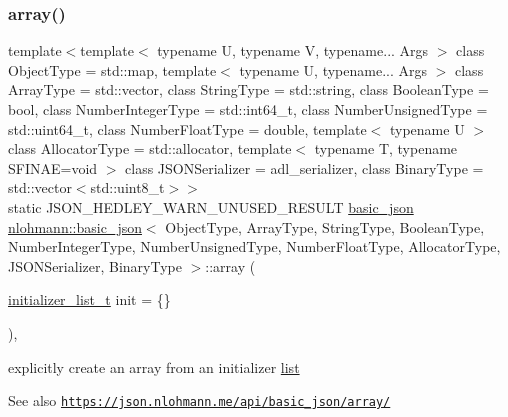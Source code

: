 \subsubsection{\texorpdfstring{array()}{array()}}
{\footnotesize\ttfamily template$<$template$<$ typename U, typename V, typename... Args $>$ class Object\+Type = std\+::map, template$<$ typename U, typename... Args $>$ class Array\+Type = std\+::vector, class String\+Type  = std\+::string, class Boolean\+Type  = bool, class Number\+Integer\+Type  = std\+::int64\+\_\+t, class Number\+Unsigned\+Type  = std\+::uint64\+\_\+t, class Number\+Float\+Type  = double, template$<$ typename U $>$ class Allocator\+Type = std\+::allocator, template$<$ typename T, typename S\+F\+I\+N\+A\+E=void $>$ class J\+S\+O\+N\+Serializer = adl\+\_\+serializer, class Binary\+Type  = std\+::vector$<$std\+::uint8\+\_\+t$>$$>$ \\
static J\+S\+O\+N\+\_\+\+H\+E\+D\+L\+E\+Y\+\_\+\+W\+A\+R\+N\+\_\+\+U\+N\+U\+S\+E\+D\+\_\+\+R\+E\+S\+U\+LT \hyperlink{classnlohmann_1_1basic__json}{basic\+\_\+json} \hyperlink{classnlohmann_1_1basic__json}{nlohmann\+::basic\+\_\+json}$<$ Object\+Type, Array\+Type, String\+Type, Boolean\+Type, Number\+Integer\+Type, Number\+Unsigned\+Type, Number\+Float\+Type, Allocator\+Type, J\+S\+O\+N\+Serializer, Binary\+Type $>$\+::array (\begin{DoxyParamCaption}\item[{\hyperlink{classnlohmann_1_1basic__json_ac569f292a070dfd2f6b69c16e746095a}{initializer\+\_\+list\+\_\+t}}]{init = {\ttfamily \{\}} }\end{DoxyParamCaption})\hspace{0.3cm}{\ttfamily [inline]}, {\ttfamily [static]}}



explicitly create an array from an initializer \hyperlink{protocollist-p}{list} 

\begin{DoxySeeAlso}{See also}
\href{https://json.nlohmann.me/api/basic_json/array/}{\tt https\+://json.\+nlohmann.\+me/api/basic\+\_\+json/array/} 
\end{DoxySeeAlso}
\mbox{\label{classnlohmann_1_1basic__json_a52b18a5b7e68652c65b070900c438c6e}} 
